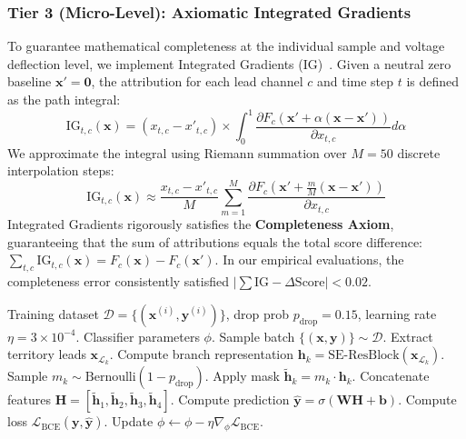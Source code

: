 \documentclass[5p,twocolumn,10pt]{elsarticle}
\begin{document}
\subsubsection{Tier 3 (Micro-Level): Axiomatic Integrated Gradients}
To guarantee mathematical completeness at the individual sample and voltage deflection level, we implement Integrated Gradients (IG)~\cite{sundararajan2017axiomatic}. Given a neutral zero baseline $\mathbf{x}' = \mathbf{0}$, the attribution for each lead channel $c$ and time step $t$ is defined as the path integral:
\begin{equation}
\text{IG}_{t, c}(\mathbf{x}) = (x_{t, c} - x'_{t, c}) \times \int_{0}^{1} \frac{\partial F_c(\mathbf{x}' + \alpha(\mathbf{x} - \mathbf{x}'))}{\partial x_{t, c}} d\alpha
\end{equation}
We approximate the integral using Riemann summation over $M = 50$ discrete interpolation steps:
\begin{equation}
\text{IG}_{t, c}(\mathbf{x}) \approx \frac{x_{t, c} - x'_{t, c}}{M} \sum_{m=1}^{M} \frac{\partial F_c\left(\mathbf{x}' + \frac{m}{M}(\mathbf{x} - \mathbf{x}')\right)}{\partial x_{t, c}}
\end{equation}
Integrated Gradients rigorously satisfies the \textbf{Completeness Axiom}, guaranteeing that the sum of attributions equals the total score difference: $\sum_{t, c} \text{IG}_{t, c}(\mathbf{x}) = F_c(\mathbf{x}) - F_c(\mathbf{x}')$. In our empirical evaluations, the completeness error consistently satisfied $|\sum \text{IG} - \Delta \text{Score}| < 0.02$.

\begin{algorithm}[t]
\caption{Anatomical Territory-Dropout Classifier Training}
\label{alg:classifier_training}
\begin{algorithmic}[1]
\REQUIRE Training dataset $\mathcal{D} = \{(\mathbf{x}^{(i)}, \mathbf{y}^{(i)})\}$, drop prob $p_{\text{drop}} = 0.15$, learning rate $\eta = 3\times 10^{-4}$.
\ENSURE Classifier parameters $\phi$.
    \STATE Sample batch $\{(\mathbf{x}, \mathbf{y})\} \sim \mathcal{D}$.
        \STATE Extract territory leads $\mathbf{x}_{\mathcal{L}_k}$.
        \STATE Compute branch representation $\mathbf{h}_k = \text{SE-ResBlock}(\mathbf{x}_{\mathcal{L}_k})$.
        \STATE Sample $m_k \sim \text{Bernoulli}(1 - p_{\text{drop}})$.
        \STATE Apply mask $\tilde{\mathbf{h}}_k = m_k \cdot \mathbf{h}_k$.
    \ENDFOR
    \STATE Concatenate features $\mathbf{H} = [\tilde{\mathbf{h}}_1, \tilde{\mathbf{h}}_2, \tilde{\mathbf{h}}_3, \tilde{\mathbf{h}}_4]$.
    \STATE Compute prediction $\hat{\mathbf{y}} = \sigma(\mathbf{W} \mathbf{H} + \mathbf{b})$.
    \STATE Compute loss $\mathcal{L}_{\text{BCE}}(\mathbf{y}, \hat{\mathbf{y}})$.
    \STATE Update $\phi \leftarrow \phi - \eta \nabla_\phi \mathcal{L}_{\text{BCE}}$.
\ENDWHILE
\end{algorithmic}
\end{algorithm}
\end{document}
